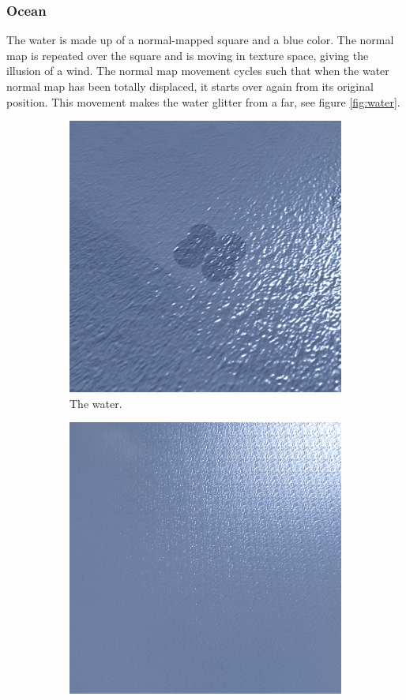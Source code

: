\subsubsection{Ocean}
The water is made up of a normal-mapped square and a blue color. The normal map is repeated over the square and is moving in texture space, giving the illusion of a wind. The normal map movement cycles such that when the water normal map has been totally displaced, it starts over again from its original position. This movement makes the water glitter from a far, see figure \ref{fig:water}.
\begin{figure}[H]
\begin{subfigure}{.5\textwidth}
  \centering
  \includegraphics[width=0.9\linewidth]{images/waterWaves.png}
  \caption{The water.}
  \label{fig:waterWaves}
\end{subfigure}%
\begin{subfigure}{.5\textwidth}
  \centering
  \includegraphics[width=0.9\linewidth]{images/waterGlimmer.png}

\end{subfigure}
\end{figure}

